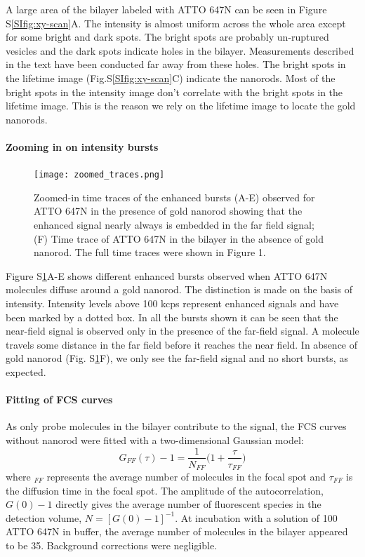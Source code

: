 A large area of the bilayer labeled with ATTO 647N can be seen in Figure S\ref{SIfig:xy-scan}A.
The intensity is almost uniform across the whole area except for some bright and dark spots.
The bright spots are probably un-ruptured vesicles and the dark spots indicate holes in the bilayer.
Measurements described in the text have been conducted far away from these holes.
The bright spots in the lifetime image (Fig.S\ref{SIfig:xy-scan}C) indicate the nanorods.
Most of the bright spots in the intensity image don't correlate with the bright spots in the lifetime image.
This is the reason we rely on the lifetime image to locate the gold nanorods.

\newpage
\paragraph*{Zooming in on intensity bursts}
\begin{figure}%
  \centering
  \texttt{[image: zoomed\_traces.png]}
  \makeatletter
  \renewcommand{\fnum@figure}{\figurename~S\thefigure}
  \makeatother{}
  \caption{Zoomed-in time traces of the enhanced bursts (A-E) observed for ATTO 647N in the presence of gold nanorod showing that the enhanced signal nearly always is embedded in the far field signal; (F) Time trace of ATTO 647N in the bilayer in the absence of gold nanorod.
  The full time traces were shown in Figure 1.}
  \label{SIfig:zoomed-trace}
\end{figure}

Figure S\ref{SIfig:zoomed-trace}A-E shows different enhanced bursts observed when ATTO 647N molecules diffuse around a gold nanorod.
The distinction is made on the basis of intensity.
Intensity levels above 100 kcps represent enhanced signals and have been marked by a dotted box.
In all the bursts shown it can be seen that the near-field signal is observed only in the presence of the far-field signal.
A molecule travels some distance in the far field before it reaches the near field.
In absence of gold nanorod (Fig. S\ref{SIfig:zoomed-trace}F), we only see the far-field signal and no short bursts, as expected.
\paragraph*{Fitting of FCS curves}
As only probe molecules in the bilayer contribute to the signal, the FCS curves without nanorod were fitted with a two-dimensional Gaussian model:
\begin{equation}
  G_{FF}(\tau)-1 = \frac{1}{N_{FF}}\Bigg(1+\frac{\tau}{\tau_{FF}}\Bigg)
  \label{eq:2Dgauss}
\end{equation}
where $_{FF}$ represents the average number of molecules in the focal spot and $\tau_{FF}$ is the diffusion time in the focal spot.
The amplitude of the autocorrelation, $G(0)-1$ directly gives the average number of fluorescent species in the detection volume, $N=[G(0)-1]^{-1}$.
At incubation with a solution of \SI{100}{\nM} ATTO 647N in buffer, the average number of molecules in the bilayer appeared to be 35.
Background corrections were negligible.

